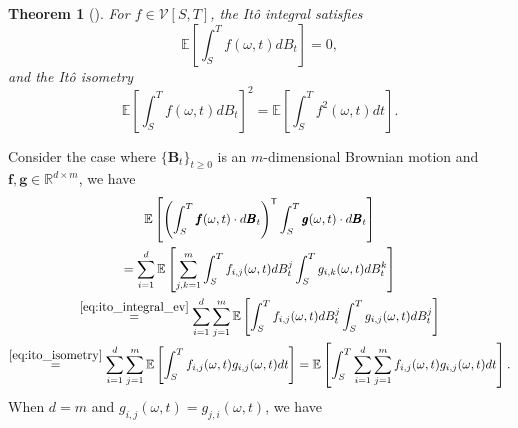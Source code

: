 \documentclass[12pt]{article}
\newtheorem{theorem}{Theorem}[section]
\theoremstyle{definition}
\numberwithin{equation}{section}
\newcommand{\R}{\mathbb{R}}
\newcommand{\E}{\mathbb{E}}
\newcommand{\CV}{\mathcal{V}}
\newcommand{\ev}[1]{\mathbb{E}\left[{#1}\right]}
\begin{document}
\begin{theorem}[\autocite{eAppliedStochasticAnalysis2021}]
  \label{thm:ito_isometry}
  For $f \in \CV[S,T]$, the Itô integral satisfies
  \begin{equation}
    \label{eq:ito_integral_ev}
    \E \left[ \int_S^T f(\omega,t)dB_t \right] = 0,
  \end{equation}
  and the \emph{Itô isometry}
  \begin{equation}
    \label{eq:ito_isometry}
    \E \left[ \int_S^T f(\omega,t)dB_t \right]^2 = \E \left[ \int_S^T f^2(\omega,t)dt \right].
  \end{equation}
\end{theorem}
Consider the case where $\{\pmb{B}_t\}_{t\geq0}$ is an $m$-dimensional Brownian motion and $\pmb{f},\pmb{g}  \in \R^{d \times m}$, we have
\begin{multline*}
  \ev{\left(\int_S^T \pmb{f}(\omega, t)\cdot d\pmb{B}_t\right)^\mathsf{T}\int_S^T \pmb{g}(\omega, t)\cdot d\pmb{B}_t}\\
     = \sum_{i=1}^d \ev{\sum_{j,k=1}^m \int_S^T f_{i,j}(\omega, t)dB_t^j\int_S^T g_{i,k}(\omega, t)dB_t^k}\\
    \overset{\eqref{eq:ito_integral_ev}}{=} \sum_{i=1}^d \sum_{j=1}^m \ev{\int_S^T f_{i,j}(\omega, t)dB_t^j\int_S^T g_{i,j}(\omega, t)dB_t^j} \\
    \overset{\eqref{eq:ito_isometry}}{=} \sum_{i=1}^d \sum_{j=1}^m \ev{\int_S^T f_{i,j}(\omega, t)g_{i,j}(\omega, t)dt}
    = \ev{\int_S^T \sum_{i=1}^d \sum_{j=1}^m f_{i,j}(\omega, t)g_{i,j}(\omega, t)dt}.
\end{multline*}
When $d = m$ and $g_{i,j}(\omega,t) = g_{j,i}(\omega,t)$, we have
\end{document}
